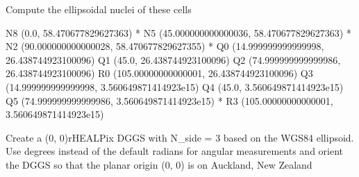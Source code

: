 \documentclass[a4paper,12ptopenany,oneside,english]{sphinxmanual}
\begin{document}
\sphinxAtStartPar
Compute the ellipsoidal nuclei of these cells

\begin{sphinxVerbatim}[commandchars=\\\{\}]
   
       
         
\end{sphinxVerbatim}
\begin{description}
\sphinxAtStartPar
N8 (0.0, 58.470677829627363) *
N5 (45.000000000000036, 58.470677829627363) *
N2 (90.000000000000028, 58.470677829627355) *
Q0 (14.999999999999998, 26.438744923100096)
Q1 (45.0, 26.438744923100096)
Q2 (74.999999999999986, 26.438744923100096)
R0 (105.00000000000001, 26.438744923100096)
Q3 (14.999999999999998, 3.560649871414923e\sphinxhyphen{}15)
Q4 (45.0, 3.560649871414923e\sphinxhyphen{}15)
Q5 (74.999999999999986, 3.560649871414923e\sphinxhyphen{}15) *
R3 (105.00000000000001, 3.560649871414923e\sphinxhyphen{}15)

\end{description}

\sphinxAtStartPar
Create a (0, 0)\sphinxhyphen{}rHEALPix DGGS with N\_side = 3 based on the WGS84 ellipsoid.
Use degrees instead of the default radians for angular measurements and
orient the DGGS so that the planar origin (0, 0) is on Auckland, New Zealand
\end{document}
